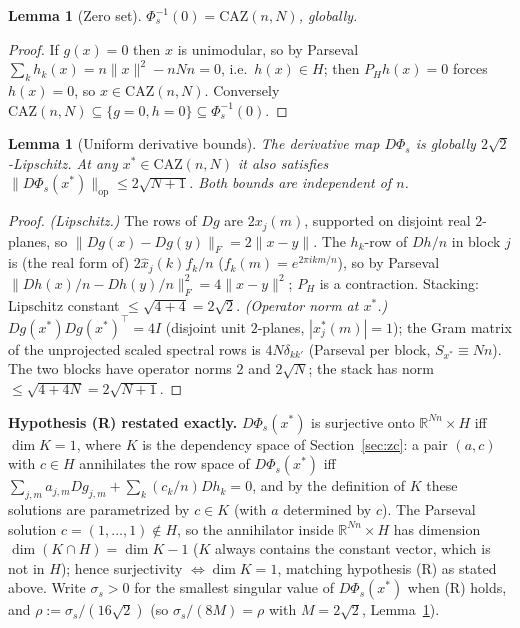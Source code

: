 \documentclass[11pt]{article}
\theoremstyle{plain}
\newtheorem{lemma}[theorem]{Lemma}
\theoremstyle{definition}
\theoremstyle{remark}
\newcommand{\R}{\mathbb R}
\newcommand{\CAZ}{\mathrm{CAZ}}
\begin{document}
\begin{lemma}[Zero set]\label{lem:phis-zero}
$\Phi_s^{-1}(0)=\CAZ(n,N)$, globally.
\end{lemma}
\begin{proof}
If $g(x)=0$ then $x$ is unimodular, so by Parseval
$\sum_kh_k(x)=n\|x\|^2-nNn=0$, i.e.\ $h(x)\in H$; then $P_Hh(x)=0$ forces
$h(x)=0$, so $x\in\CAZ(n,N)$. Conversely $\CAZ(n,N)\subseteq\{g=0,h=0\}\subseteq\Phi_s^{-1}(0)$.
\end{proof}

\begin{lemma}[Uniform derivative bounds]\label{lem:phis-lip}
The derivative map $D\Phi_s$ is globally $2\sqrt2$-Lipschitz. At any
$x^*\in\CAZ(n,N)$ it also satisfies
$\|D\Phi_s(x^*)\|_{\mathrm{op}}\le2\sqrt{N+1}$. Both bounds are independent
of $n$.
\end{lemma}
\begin{proof}
\emph{(Lipschitz.)} The rows of $Dg$ are $2x_j(m)$, supported on disjoint
real $2$-planes, so $\|Dg(x)-Dg(y)\|_F=2\|x-y\|$. The $h_k$-row of
$Dh/n$ in block $j$ is (the real form of) $2\hat x_j(k)f_k/n$
($f_k(m)=e^{2\pi ikm/n}$), so by Parseval
$\|Dh(x)/n-Dh(y)/n\|_F^2=4\|x-y\|^2$; $P_H$ is a contraction. Stacking:
Lipschitz constant $\le\sqrt{4+4}=2\sqrt2$.
\emph{(Operator norm at $x^*$.)} $Dg(x^*)Dg(x^*)^\top=4I$ (disjoint unit
$2$-planes, $|x^*_j(m)|=1$); the Gram matrix of the unprojected scaled
spectral rows is $4N\delta_{kk'}$ (Parseval per block, $S_{x^*}\equiv Nn$).
The two blocks have operator norms $2$ and $2\sqrt N$; the stack has norm
$\le\sqrt{4+4N}=2\sqrt{N+1}$.
\end{proof}

\textbf{Hypothesis (R) restated exactly.} $D\Phi_s(x^*)$ is surjective onto
$\R^{Nn}\times H$ iff $\dim K=1$, where $K$ is the dependency space of
Section~\ref{sec:zc}: a pair $(a,c)$ with $c\in H$ annihilates the row
space of $D\Phi_s(x^*)$ iff $\sum_{j,m}a_{j,m}Dg_{j,m}+\sum_k(c_k/n)Dh_k=0$,
and by the definition of $K$ these solutions are parametrized by $c\in K$
(with $a$ determined by $c$). The Parseval solution $c=(1,\dots,1)\notin H$,
so the annihilator inside $\R^{Nn}\times H$ has dimension $\dim(K\cap H)=\dim K-1$
($K$ always contains the constant vector, which is not in $H$); hence
surjectivity $\iff\dim K=1$, matching hypothesis (R) as stated above.
Write $\sigma_s>0$ for the smallest singular value of $D\Phi_s(x^*)$ when
(R) holds, and $\rho:=\sigma_s/(16\sqrt2)$ (so $\sigma_s/(8M)=\rho$ with
$M=2\sqrt2$, Lemma~\ref{lem:phis-lip}).
\end{document}
